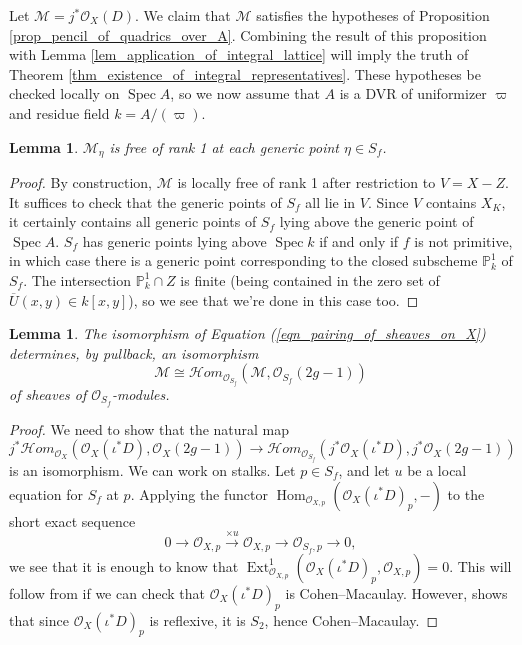 \documentclass{article} %
\newtheorem{lemma}[proposition]{Lemma}
\numberwithin{equation}{section}
\DeclareMathOperator{\Hom}{Hom}
\DeclareMathOperator{\Ext}{Ext}
\DeclareMathOperator{\Spec}{Spec}
\newcommand{\bbP}{\mathbb{P}}
\newcommand{\cO}{\mathcal{O}}
\newcommand{\cM}{\mathcal{M}}
\newcommand{\ShHom}{\mathcal{H}\!\mathit{om}}
\begin{document}
Let $\mathcal{M} = j^\ast \cO_X(D)$. We claim that $\mathcal{M}$ satisfies the hypotheses of Proposition \ref{prop_pencil_of_quadrics_over_A}. Combining the result of this proposition with Lemma \ref{lem_application_of_integral_lattice} will imply the truth of Theorem \ref{thm_existence_of_integral_representatives}. These hypotheses be checked locally on $\Spec A$, so we now assume that $A$ is a DVR of uniformizer $\varpi$ and residue field $k = A / (\varpi)$. 
\begin{lemma}
    $\cM_\eta$ is free of rank 1 at each generic point $\eta \in S_f$.
\end{lemma}
\begin{proof}
    By construction, $\cM$ is locally free of rank 1 after restriction to $V = X - Z$. It suffices to check that the generic points of $S_f$ all lie in $V$. Since $V$ contains $X_K$, it certainly contains all generic points of $S_f$ lying above the generic point of $\Spec A$. $S_f$ has generic points lying above $\Spec k$ if and only if $f$ is not primitive, in which case there is a generic point corresponding to the closed subscheme $\bbP^1_k$ of $S_f$. The intersection $\bbP^1_k \cap Z$ is finite (being contained in the zero set of $\overline{U}(x, y) \in k[x, y]$), so we see that we're done in this case too. 
\end{proof}
\begin{lemma}\label{lem_pullback_of_pairing_to_Weierstrass_locus}
    The isomorphism of Equation (\ref{eqn_pairing_of_sheaves_on_X}) determines, by pullback, an isomorphism
    \[ \mathcal{M} \cong \ShHom_{\cO_{S_f}}(\mathcal{M}, \cO_{S_f}(2g-1))  \]
    of sheaves of $\cO_{S_f}$-modules.
\end{lemma}
\begin{proof}
    We need to show that the natural map
    \[ j^\ast \ShHom_{\cO_X}(\cO_X(\iota^\ast D), \cO_X(2g-1)) \to \ShHom_{\cO_{S_f}}( j^\ast \cO_X(\iota^\ast D), j^\ast \cO_X(2g-1)) \]
    is an isomorphism. We can work on stalks. Let $p \in S_f$, and let $u$ be a local equation for $S_f$ at $p$. Applying the functor $\Hom_{\cO_{X, p}}(\cO_X(\iota^\ast D)_p, -)$ to the short exact sequence
    \[ 0 \to \cO_{X, p} \overset{\times u}{\to} \cO_{X, p} \to \cO_{S_f, p} \to 0, \]
    we see that it is enough to know that $\Ext^1_{\cO_{X, p}}(\cO_X(\iota^\ast D)_p, \cO_{X, p}) = 0$. This will follow from \cite[Corollary 1.3]{Har92} if we can check that $\cO_X(\iota^\ast D)_p$ is Cohen--Macaulay. However, \cite[Theorem 1.9]{Har92} shows that since $\cO_X(\iota^\ast D)_p$ is reflexive, it is $S_2$, hence Cohen--Macaulay. 
\end{proof}
\end{document}

